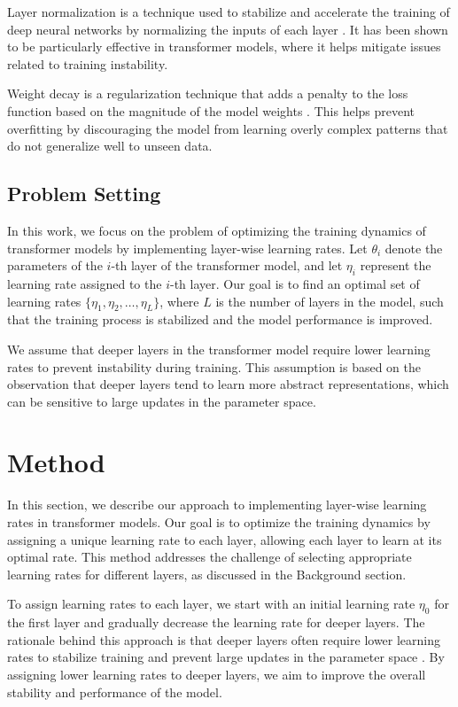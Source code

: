 \documentclass{article} %
\begin{document}
Layer normalization is a technique used to stabilize and accelerate the training of deep neural networks by normalizing the inputs of each layer \citep{ba2016layer}. It has been shown to be particularly effective in transformer models, where it helps mitigate issues related to training instability.

Weight decay is a regularization technique that adds a penalty to the loss function based on the magnitude of the model weights \citep{loshchilov2017adamw}. This helps prevent overfitting by discouraging the model from learning overly complex patterns that do not generalize well to unseen data.

\subsection{Problem Setting}
In this work, we focus on the problem of optimizing the training dynamics of transformer models by implementing layer-wise learning rates. Let $\theta_i$ denote the parameters of the $i$-th layer of the transformer model, and let $\eta_i$ represent the learning rate assigned to the $i$-th layer. Our goal is to find an optimal set of learning rates $\{\eta_1, \eta_2, \ldots, \eta_L\}$, where $L$ is the number of layers in the model, such that the training process is stabilized and the model performance is improved.

We assume that deeper layers in the transformer model require lower learning rates to prevent instability during training. This assumption is based on the observation that deeper layers tend to learn more abstract representations, which can be sensitive to large updates in the parameter space.

\section{Method}
\label{sec:method}
In this section, we describe our approach to implementing layer-wise learning rates in transformer models. Our goal is to optimize the training dynamics by assigning a unique learning rate to each layer, allowing each layer to learn at its optimal rate. This method addresses the challenge of selecting appropriate learning rates for different layers, as discussed in the Background section.

To assign learning rates to each layer, we start with an initial learning rate $\eta_0$ for the first layer and gradually decrease the learning rate for deeper layers. The rationale behind this approach is that deeper layers often require lower learning rates to stabilize training and prevent large updates in the parameter space \citep{ba2016layer}. By assigning lower learning rates to deeper layers, we aim to improve the overall stability and performance of the model.
\end{document}
